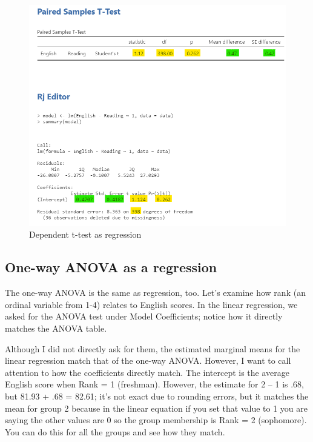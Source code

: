 \documentclass[
]{book}
\begin{document}
\begin{figure}

{\centering \includegraphics[width=1\linewidth]{images/14-regression-wrap-up/dependent_t-test} 

}

\caption{Dependent t-test as regression}\label{fig:unnamed-chunk-3}
\end{figure}

\hypertarget{one-way-anova-as-a-regression}{%
\subsection{One-way ANOVA as a regression}\label{one-way-anova-as-a-regression}}

The one-way ANOVA is the same as regression, too. Let's examine how rank (an ordinal variable from 1-4) relates to English scores. In the linear regression, we asked for the ANOVA test under Model Coefficients; notice how it directly matches the ANOVA table.

Although I did not directly ask for them, the estimated marginal means for the linear regression match that of the one-way ANOVA. However, I want to call attention to how the coefficients directly match. The intercept is the average English score when Rank = 1 (freshman). However, the estimate for 2 -- 1 is .68, but 81.93 + .68 = 82.61; it's not exact due to rounding errors, but it matches the mean for group 2 because in the linear equation if you set that value to 1 you are saying the other values are 0 so the group membership is Rank = 2 (sophomore). You can do this for all the groups and see how they match.
\end{document}
